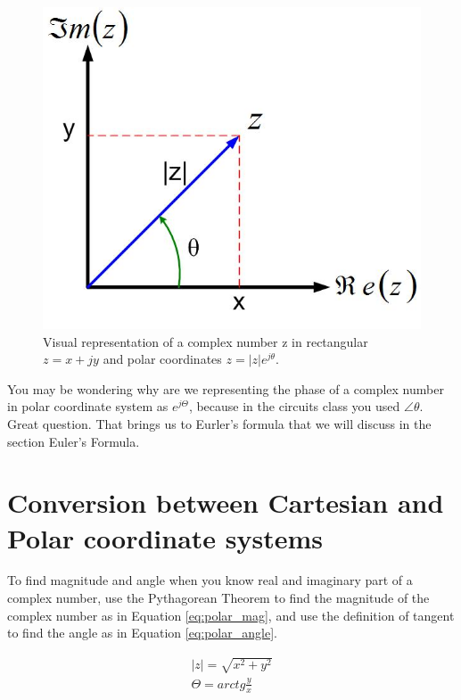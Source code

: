 \documentclass{ximera}
\begin{document}
\begin{figure}[htbp]
\begin{center}
\includegraphics[scale=0.3]{../jpg/Complex_Numbersz12.jpg}
\end{center}
\caption{Visual representation of a complex number z in rectangular $z=x+jy$ and polar coordinates $z=|z|e^{j \theta}$.}
\label{cartpol}
\end{figure}




You may be wondering why are we representing the phase of a complex number in polar coordinate system as  $e^{j \Theta}$, because in the circuits class you used $\angle \theta$. Great question. That brings us to Eurler's formula that we will discuss in the section Euler's Formula.

\section{Conversion between Cartesian and Polar coordinate systems}
  
  To find magnitude and angle when you know real and imaginary part of a complex number, use the Pythagorean Theorem to find the magnitude of the complex number as in Equation \ref{eq:polar_mag}, and use the definition of tangent to find the angle as in Equation \ref{eq:polar_angle}.

\begin{eqnarray}
|z|=\sqrt{x^2+y^2} \label{eq:polar_mag}\\
\Theta = arctg \frac{y}{x} \label{eq:polar_angle}
\end{eqnarray}
 
\end{document}
